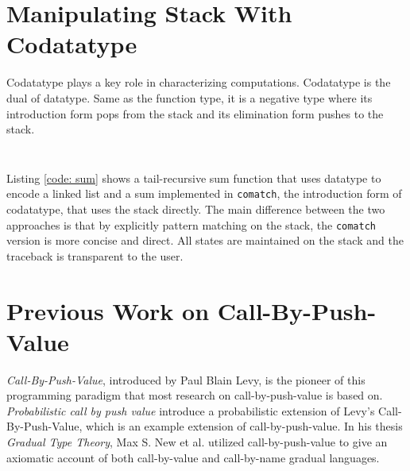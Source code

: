\documentclass[acmsmall,nonacm]{acmart}
\begin{document}
\section{Manipulating Stack With Codatatype}

Codatatype plays a key role in characterizing computations. Codatatype is the dual of datatype. Same as the function type, it is a negative type where its introduction form pops from the stack and its elimination form pushes to the stack.
\begin{listing}[ht]
    \begin{multicols}{2}
        \inputminted{Haskell}{examples/sumfn.zydeco}
        \vfill
        \inputminted{Haskell}{examples/sumco.zydeco}
        \vfill
    \end{multicols}
    \label{code: sum}
\end{listing}

Listing \ref{code: sum} shows a tail-recursive sum function that uses datatype to encode a linked list and a sum implemented in \texttt{comatch}, the introduction form of codatatype, that uses the stack directly. The main difference between the two approaches is that by explicitly pattern matching on the stack, the \texttt{comatch} version is more concise and direct. All states are maintained on the stack and the traceback is transparent to the user.

\section{Previous Work on Call-By-Push-Value}

\textit{Call-By-Push-Value}, introduced by Paul Blain Levy, is the pioneer of this programming paradigm that most research on call-by-push-value is based on. \textit{Probabilistic call by push value} introduce a probabilistic extension of Levy's Call-By-Push-Value, which is an example extension of call-by-push-value. In his thesis \textit{Gradual Type Theory}, Max S. New et al. utilized call-by-push-value to give an axiomatic account of both call-by-value and call-by-name gradual languages.
\end{document}

